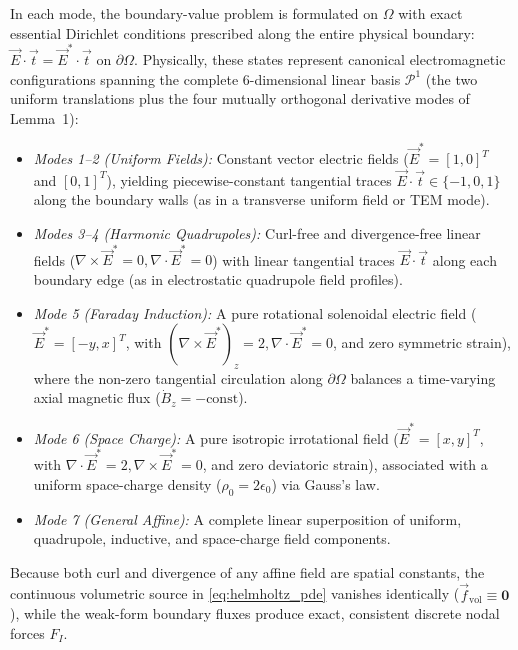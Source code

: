 \documentclass[preprint,12pt]{elsarticle}
\begin{document}
In each mode, the boundary-value problem is formulated on $\Omega$ with exact essential Dirichlet conditions prescribed along the entire physical boundary: $\vec{E} \cdot \vec{t} = \vec{E}^* \cdot \vec{t}$ on $\partial\Omega$. Physically, these states represent canonical electromagnetic configurations spanning the complete 6-dimensional linear basis $\mathcal{P}^1$ (the two uniform translations plus the four mutually orthogonal derivative modes of Lemma~1):
\begin{itemize}
    \item \textit{Modes 1--2 (Uniform Fields):} Constant vector electric fields ($\vec{E}^* = [1, 0]^T$ and $[0, 1]^T$), yielding piecewise-constant tangential traces $\vec{E} \cdot \vec{t} \in \{-1, 0, 1\}$ along the boundary walls (as in a transverse uniform field or TEM mode).
    \item \textit{Modes 3--4 (Harmonic Quadrupoles):} Curl-free and divergence-free linear fields ($\nabla \times \vec{E}^* = 0, \nabla \cdot \vec{E}^* = 0$) with linear tangential traces $\vec{E} \cdot \vec{t}$ along each boundary edge (as in electrostatic quadrupole field profiles).
    \item \textit{Mode 5 (Faraday Induction):} A pure rotational solenoidal electric field ($\vec{E}^* = [-y, x]^T$, with $(\nabla \times \vec{E}^*)_z = 2, \nabla \cdot \vec{E}^* = 0$, and zero symmetric strain), where the non-zero tangential circulation along $\partial\Omega$ balances a time-varying axial magnetic flux ($\dot{B}_z = -\mathrm{const}$).
    \item \textit{Mode 6 (Space Charge):} A pure isotropic irrotational field ($\vec{E}^* = [x, y]^T$, with $\nabla \cdot \vec{E}^* = 2, \nabla \times \vec{E}^* = 0$, and zero deviatoric strain), associated with a uniform space-charge density ($\rho_0 = 2\epsilon_0$) via Gauss's law.
    \item \textit{Mode 7 (General Affine):} A complete linear superposition of uniform, quadrupole, inductive, and space-charge field components.
\end{itemize}
Because both curl and divergence of any affine field are spatial constants, the continuous volumetric source in \eqref{eq:helmholtz_pde} vanishes identically ($\vec{f}_{\mathrm{vol}} \equiv \mathbf{0}$), while the weak-form boundary fluxes produce exact, consistent discrete nodal forces $F_I$.
\end{document}
